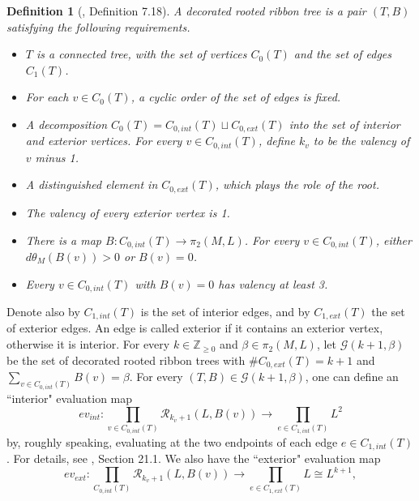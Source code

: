 \documentclass[a4paper]{article}
\newtheorem{definition}[theorem]{Definition}
\numberwithin{equation}{section}
\begin{document}
\begin{definition}[\cite{ki2}, Definition 7.18]\label{definition:tree}
A decorated rooted ribbon tree is a pair $(T,B)$ satisfying the following requirements.
\begin{itemize}
	\item[(i)] $T$ is a connected tree, with the set of vertices $C_0(T)$ and the set of edges $C_1(T)$.
	\item[(ii)] For each $v\in C_0(T)$, a cyclic order of the set of edges is fixed.
	\item[(iii)] A decomposition $C_0(T)=C_{0,\mathit{int}}(T)\sqcup C_{0,\mathit{ext}}(T)$ into the set of interior and exterior vertices. For every $v\in C_{0,\mathit{int}}(T)$, define $k_v$ to be the valency of $v$ minus 1.
	\item[(iv)] A distinguished element in $C_{0,\mathit{ext}}(T)$, which plays the role of the root.
	\item[(v)] The valency of every exterior vertex is 1.
	\item[(vi)] There is a map $B:C_{0,\mathit{int}}(T)\rightarrow\pi_2(M,L)$. For every $v\in C_{0,\mathit{int}}(T)$, either $d\theta_M(B(v))>0$ or $B(v)=0$.
	\item[(vii)] Every $v\in C_{0,\mathit{int}}(T)$ with $B(v)=0$ has valency at least 3.
\end{itemize}
\end{definition}
Denote also by $C_{1,\mathit{int}}(T)$ is the set of interior edges, and by $C_{1,\mathit{ext}}(T)$ the set of exterior edges. An edge is called exterior if it contains an exterior vertex, otherwise it is interior. For every $k\in\mathbb{Z}_{\geq0}$ and $\beta\in\pi_2(M,L)$, let $\mathcal{G}(k+1,\beta)$ be the set of decorated rooted ribbon trees with $\# C_{0,\mathit{ext}}(T)=k+1$ and $\sum_{v\in C_{0,\mathit{int}}(T)}B(v)=\beta$. For every $(T,B)\in\mathcal{G}(k+1,\beta)$, one can define an ``interior" evaluation map
\begin{equation}\label{eq:ev-int}
\mathit{ev}_\mathit{int}:\prod_{v\in C_{0,\mathit{int}}(T)}\mathcal{R}_{k_v+1}(L,B(v))\rightarrow\prod_{e\in C_{1,\mathit{int}}(T)}L^2
\end{equation}
by, roughly speaking, evaluating at the two endpoints of each edge $e\in C_{1,\mathit{int}}(T)$. For details, see \cite{fooo4}, Section 21.1. We also have the ``exterior" evaluation map
\begin{equation}\label{eq:ev-ext}
\mathit{ev}_\mathit{ext}:\prod_{C_{0,\mathit{int}}(T)}\mathcal{R}_{k_v+1}(L,B(v))\rightarrow\prod_{e\in C_{1,\mathit{ext}}(T)}L\cong L^{k+1},
\end{equation}
\end{document}
